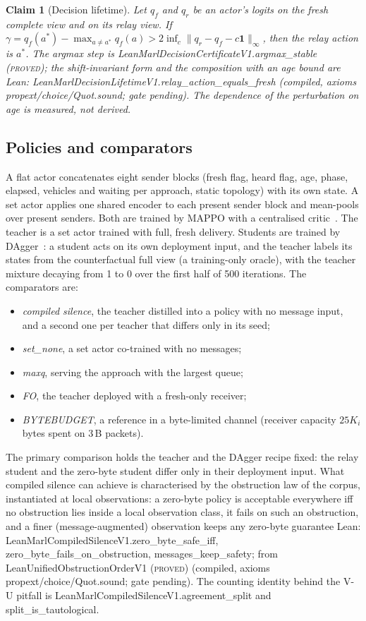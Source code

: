 \documentclass[11pt]{article}
\newtheorem{claim}{Claim}
\theoremstyle{definition}
\newcommand{\lean}[1]{\textsf{\footnotesize #1}}
\newcommand{\PROVED}{\textsc{proved}}
\newcommand{\LEANC}[1]{\textsf{\footnotesize Lean: #1 (compiled, axioms propext/choice/Quot.sound; gate pending)}}
\begin{document}
\begin{claim}[Decision lifetime]\label{cl:life}
Let $q_f$ and $q_r$ be an actor's logits on the fresh complete view and on its relay view. If $\gamma=q_f(a^\ast)-\max_{a\ne
a^\ast}q_f(a)>2\inf_c\|q_r-q_f-c\mathbf1\|_\infty$, then the relay action is $a^\ast$. The argmax step is
\lean{LeanMarlDecisionCertificateV1.argmax\_stable} (\PROVED); the shift-invariant form and the composition with an age
bound are \LEANC{LeanMarlDecisionLifetimeV1.relay\_action\_equals\_fresh}. The dependence of the perturbation on age is
measured, not derived.
\end{claim}

\subsection{Policies and comparators}\label{sec:policies}
A flat actor concatenates eight sender blocks (fresh flag, heard flag, age, phase, elapsed, vehicles and waiting per
approach, static topology) with its own state. A set actor applies one shared encoder to each present sender block and
mean-pools over present senders. Both are trained by MAPPO with a centralised critic~\cite{mappo}. The teacher is a set
actor trained with full, fresh delivery. Students are trained by DAgger~\cite{dagger}: a student acts on its own
deployment input, and the teacher labels its states from the counterfactual full view (a training-only oracle), with the
teacher mixture decaying from 1 to 0 over the first half of 500 iterations. The comparators are:
\begin{itemize}
\item \emph{compiled silence}, the teacher distilled into a policy with no message input, and a second one per teacher
that differs only in its seed;
\item \emph{set\_none}, a set actor co-trained with no messages;
\item \emph{maxq}, serving the approach with the largest queue;
\item \emph{FO}, the teacher deployed with a fresh-only receiver;
\item \emph{BYTEBUDGET}, a reference in a byte-limited channel (receiver capacity $25K_i$ bytes spent on 3\,B packets).
\end{itemize}
The primary comparison holds the teacher and the DAgger recipe fixed: the relay student and the zero-byte student differ
only in their deployment input. What compiled silence can achieve is characterised by the obstruction law of the corpus,
instantiated at local observations: a zero-byte policy is acceptable everywhere iff no obstruction lies inside a local
observation class, it fails on such an obstruction, and a finer (message-augmented) observation keeps any zero-byte
guarantee \LEANC{LeanMarlCompiledSilenceV1.zero\_byte\_safe\_iff, zero\_byte\_fails\_on\_obstruction, messages\_keep\_safety;
from LeanUnifiedObstructionOrderV1 (\PROVED)}. The counting identity behind the V-U pitfall is
\lean{LeanMarlCompiledSilenceV1.agreement\_split} and \lean{split\_is\_tautological}.
\end{document}
